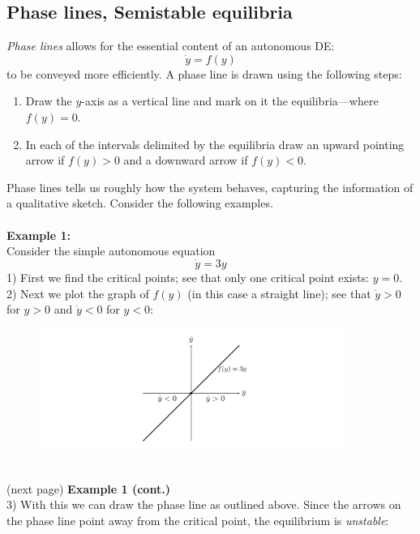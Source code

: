 \documentclass{report}
\begin{document}
\subsection{Phase lines, Semistable equilibria}
\textit{Phase lines} allows for the essential content of an autonomous DE:
\begin{equation*}
\dot{y}=f(y)
\end{equation*}
to be conveyed more efficiently. A phase line is drawn using the following steps:
\begin{enumerate}
\item Draw the $y$-axis as a vertical line and mark on it the equilibria---where $f(y)=0$.
\item In each of the intervals delimited by the equilibria draw an upward pointing arrow if $f(y)>0$ and a downward arrow if $f(y)<0$.
\end{enumerate}
Phase lines tells us roughly how the system behaves, capturing the information of a qualitative sketch. Consider 
the following examples.\\
\vspace{1mm}\\
\textbf{Example 1:}\\
Consider the simple autonomous equation
\begin{equation*}
\dot{y}=3y
\end{equation*}
1) First we find the critical points; see that only one critical point exists: $y=0$. 
2) Next we plot the graph of $f(y)$ (in this case a straight line); see that $\dot{y}>0$ for $y>0$ and $\dot{y}<0$ for $y<0$:
\begin{figure}[h]
\begin{center}
\includegraphics[width=10cm]{17}\\
\end{center}
\end{figure}\\
(next page)
\newpage
\noindent\textbf{Example 1 (cont.)}\\
3) With this we can draw the phase line as outlined above. Since the arrows on the phase line point
away from the critical point, the equilibrium is \textit{unstable}:
\end{document}
